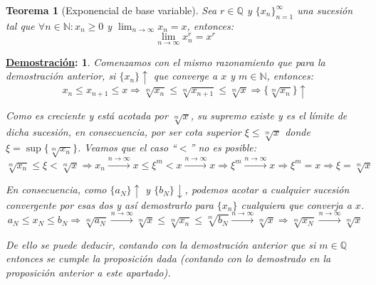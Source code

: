 \documentclass[10pt,a4paper,openright]{book}
\theoremstyle{break}
\newtheorem*{theo}{Teorema}
\newtheorem*{demo}{\underline{Demostración}:}
\begin{document}
\begin{theo}[Exponencial de base variable]
Sea $r\in \mathbb Q$ y $\{x_n\}_{n=1}^\infty$ una sucesión tal que $\forall n\in \mathbb N: x_n\geq 0$ y $\lim_{n\rightarrow\infty} x_n = x$, entonces:
$$\lim_{n\rightarrow\infty}x_n^{r} = x^r$$
\end{theo}
\begin{demo}
Comenzamos con el mismo razonamiento que para la demostración anterior, si $\{x_n\}\uparrow$ que converge a $x$ y $m\in \mathbb N$, entonces:
$$x_n\leq x_{n+1}\leq x\Rightarrow \sqrt[m]{x_n}\leq \sqrt[m]{x_{n+1}}\leq \sqrt[m]{x} \Rightarrow \{\sqrt[m]{x_n}\}\uparrow$$

Como es creciente y está acotada por $\sqrt[m]{x}$, su supremo existe y es el límite de dicha sucesión, en consecuencia, por ser cota superior $\xi\leq \sqrt[m]{x}$ donde $\xi=\sup\{\sqrt[m]{x_n}\}$. Veamos que el caso ``$<$'' no es posible:
$$\sqrt[m]{x_n}\leq \xi< \sqrt[m]{x}\Rightarrow x_n\xrightarrow{n\rightarrow\infty}x\leq \xi^m<x\xrightarrow{n\rightarrow\infty}x\Rightarrow \xi^m\xrightarrow{n\rightarrow\infty}x\Rightarrow \xi^m=x\Rightarrow \xi=\sqrt[m]{x}$$

En consecuencia, como $\{a_N\}\uparrow$ y $\{b_N\}\downarrow$, podemos acotar a cualquier sucesión convergente por esas dos y así demostrarlo para $\{x_n\}$ cualquiera que converja a $x$.
$$a_N\leq x_N\leq b_N\Rightarrow \sqrt[m]{a_N}\xrightarrow{n\rightarrow\infty}\sqrt[m]{x}\leq \sqrt[m]{x_n}\leq \sqrt[m]{b_N}\xrightarrow{n\rightarrow\infty}\sqrt[m]{x}\Rightarrow \sqrt[m]{x_N}\xrightarrow{n\rightarrow\infty}\sqrt[m]{x}$$

De ello se puede deducir, contando con la demostración anterior que si $m\in \mathbb Q$ entonces se cumple la proposición dada (contando con lo demostrado en la proposición anterior a este apartado).
\end{demo}
\end{document}
